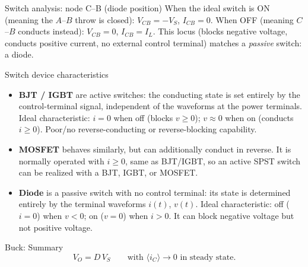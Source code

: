 \documentclass[11pt]{beamer}
\begin{document}
\begin{frame}{Switch analysis: node C--B (diode position)}
When the ideal switch is ON (meaning the $A$--$B$ throw is closed):
$V_{CB} = -V_S$, $I_{CB} = 0$. When OFF (meaning $C$--$B$ conducts
instead): $V_{CB} = 0$, $I_{CB} = I_L$. This locus (blocks negative
voltage, conducts positive current, no external control terminal)
matches a \emph{passive} switch: a diode.
\end{frame}

\begin{frame}{Switch device characteristics}
\begin{itemize}
  \item \textbf{BJT / IGBT} are active switches: the conducting state is
  set entirely by the control-terminal signal, independent of the
  waveforms at the power terminals. Ideal characteristic: $i = 0$ when
  off (blocks $v \geq 0$); $v \approx 0$ when on (conducts
  $i \geq 0$). Poor/no reverse-conducting or reverse-blocking
  capability.
  \item \textbf{MOSFET} behaves similarly, but can additionally conduct
  in reverse. It is normally operated with $i \geq 0$, same as BJT/IGBT,
  so an active SPST switch can be realized with a BJT, IGBT, or MOSFET.
  \item \textbf{Diode} is a passive switch with no control terminal: its
  state is determined entirely by the terminal waveforms $i(t)$,
  $v(t)$. Ideal characteristic: off ($i=0$) when $v<0$; on ($v=0$) when
  $i>0$. It can block negative voltage but not positive voltage.
\end{itemize}
\end{frame}

\begin{frame}{Buck: Summary}
\[
  \boxed{V_O = D\,V_S}
  \qquad\text{with } \langle i_C \rangle \to 0 \text{ in steady state.}
\]
\end{frame}
\end{document}
